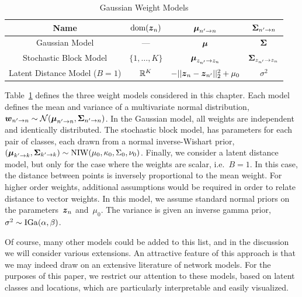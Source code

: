 \begin{table}
\begin{center}
\begin{tabular}{c|c|c|c}
Name & $\text{dom}(\boldsymbol{z}_n)$ & $\boldsymbol{\mu}_{n' \to n}$ & $\boldsymbol{\Sigma}_{n' \to n}$\\
\hline
Gaussian Model & --- & $\boldsymbol{\mu}$ & $\boldsymbol{\Sigma}$ \\
Stochastic Block Model & $\{1, \ldots, K\}$ & $\boldsymbol{\mu}_{z_{n'} \to z_n}$ & $\boldsymbol{\Sigma}_{z_{n'} \to z_n}$ \\
Latent Distance Model (${B=1}$) & $\mathbb{R}^K $ & $-||\boldsymbol{z}_n - \boldsymbol{z}_{n'}||_2^2 + \mu_0$ & $\sigma^2$
\end{tabular}
\end{center}
\caption{Gaussian Weight Models}
\label{tab:W_models}
\end{table}

Table~\ref{tab:W_models} defines the three weight models considered in this chapter.  
Each model defines the mean and variance of a multivariate
normal distribution,~$\boldsymbol{w}_{n' \to n} \sim \mathcal{N}(\boldsymbol{\mu}_{n' \to
  n}, \boldsymbol{\Sigma}_{n' \to n})$.  In the Gaussian model, all weights are
independent and identically distributed.  The stochastic block model,
has parameters for each pair of classes, each drawn from a normal
inverse-Wishart prior,~$(\boldsymbol{\mu}_{k' \to k}, \boldsymbol{\Sigma}_{k' \to k}) \sim
\mathrm{NIW}(\mu_0, \kappa_0, \Sigma_0, \nu_0)$. Finally, we
consider a latent distance model, but only for the case where the
weights are scalar, i.e.~$B=1$. In this case, the distance between
points is inversely proportional to the mean weight.  For higher order
weights, additional assumptions would be required in order to relate
distance to vector weights. In this model, we assume standard normal
priors on the parameters~$\boldsymbol{z}_n$ and~$\mu_0$.  The variance is given
an inverse gamma prior,~$\sigma^2 \sim \mathrm{IGa}(\alpha, \beta)$.

Of course, many other models could be added to this list, and in the
discussion we will consider various extensions. An attractive feature
of this approach is that we may indeed draw on an extensive literature
of network models. For the purposes of this paper, we restrict our
attention to these models, based on latent classes and locations,
which are particularly interpretable and easily visualized.


